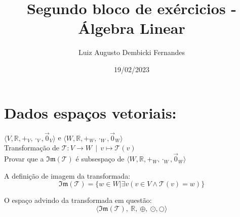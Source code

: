 \documentclass[12pt, twoside, a4]{article} %
\begin{document}
\title{Segundo bloco de exércicios - Álgebra Linear}
\author{Luiz Augusto Dembicki Fernandes}
\date{19/02/2023}
\maketitle

\section{Dados espaços vetoriais:}
\vspace{-0.3cm}
\begin{Large}
        \begin{bf}
        $\langle V, \mathbb{R}, +_V, \cdot_V, \overrightarrow{0}_V  \rangle $ e 
        $\langle W, \mathbb{R}, +_W, \cdot_W, \overrightarrow{0}_W  \rangle $ \\
        Transformação de $ \mathcal{T} : V \to W \ \ | \ \ v \mapsto \mathcal{T}(v) $ \\
        Provar que a $ \mathfrak{Im} (\mathcal{T} ) $ é subsespaço de $\langle W, \mathbb{R}, +_W, \cdot_W, \overrightarrow{0}_W  \rangle $  
    \end{bf}
\end{Large}

A definição de imagem da transformada:
\[ \mathfrak{Im} (\mathcal{T} ) = \{w \in W | \exists v(v \in V \wedge \mathcal{T} (v) = w)\} \]

O espaço advindo da transformada em questão:
\[ \langle \mathfrak{Im} (\mathcal{T}),\ \mathbb{R},\ \oplus ,\ \odot, \bigcirc \rangle \]
\end{document}

